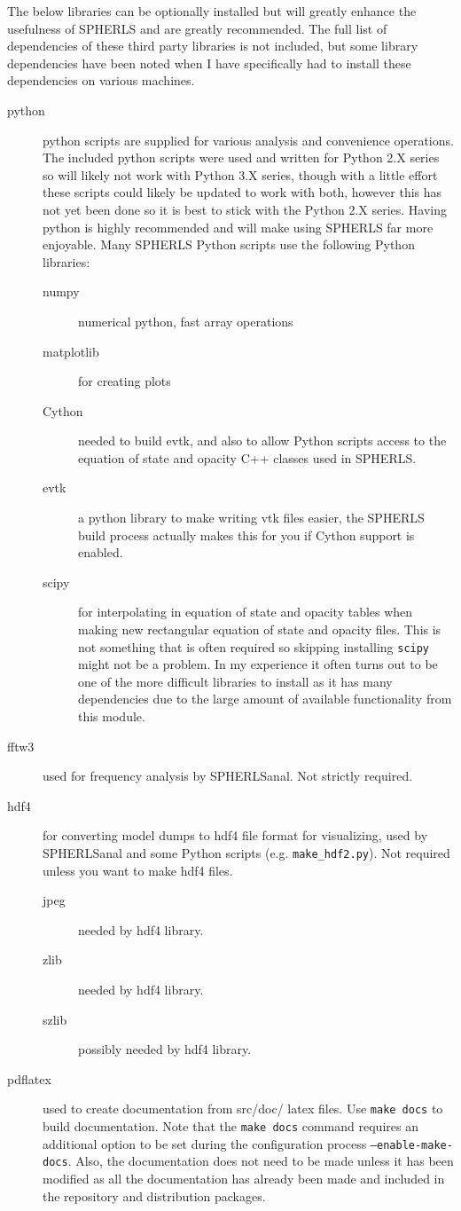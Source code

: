 \documentclass[12pt,a4paper]{book}
\begin{document}
The below libraries can be optionally installed but will greatly enhance the usefulness of SPHERLS and are greatly recommended. The full list of dependencies of these third party libraries is not included, but some library dependencies have been noted when I have specifically had to install these dependencies on various machines.
\begin{description}
\item[python] python scripts are supplied for various analysis and convenience operations.  The included python scripts were used and written for Python 2.X series so will likely not work with Python 3.X series, though with a little effort these scripts could likely be updated to work with both, however this has not yet been done so it is best to stick with the Python 2.X series. Having python is highly recommended and will make using SPHERLS far more enjoyable. Many SPHERLS Python scripts use the following Python libraries:
\begin{description}
  \item[numpy] numerical python, fast array operations
  \item[matplotlib] for creating plots
  \item[Cython] needed to build evtk, and also to allow Python scripts access to the equation of state and opacity C++ classes used in SPHERLS.
  \item[evtk] a python library to make writing vtk files easier, the SPHERLS build process actually makes this for you if Cython support is enabled.
  \item[scipy] for interpolating in equation of state and opacity tables when making new rectangular equation of state and opacity files. This is not something that is often required so skipping installing {\tt scipy} might not be a problem. In my experience it often turns out to be one of the more difficult libraries to install as it has many dependencies due to the large amount of available functionality from this module.
\end{description}
\item[fftw3] used for frequency analysis by SPHERLSanal. Not strictly required.
\item[hdf4] for converting model dumps to hdf4 file format for visualizing, used by SPHERLSanal and some Python scripts (e.g. {\tt make\_hdf2.py}). Not required unless you want to make hdf4 files.
\begin{description}
  \item[jpeg] needed by hdf4 library.
  \item[zlib] needed by hdf4 library.
  \item[szlib] possibly needed by hdf4 library.
\end{description}
\item[pdflatex] used to create documentation from src/doc/ latex files. Use {\tt make docs} to build documentation. Note that the {\tt make docs} command requires an additional option to be set during the configuration process {\tt --enable-make-docs}. Also, the documentation does not need to be made unless it has been modified as all the documentation has already been made and included in the repository and distribution packages.
\end{description}
\end{document}
